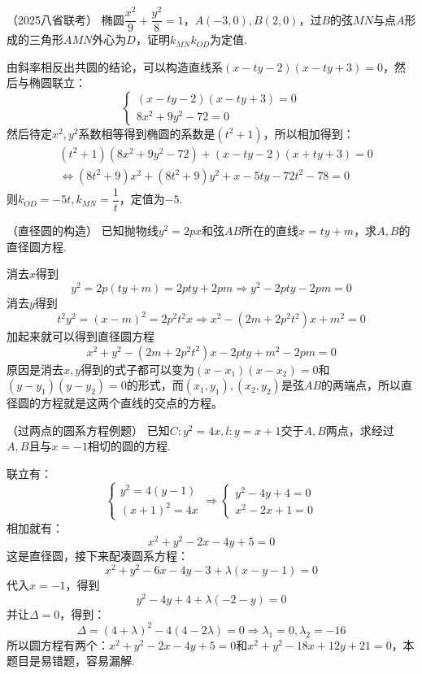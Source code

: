 \begin{example}{（2025八省联考）}{}
    椭圆$\dfrac{x^2}{9}+\dfrac{y^2}{8}=1$，$A(-3,0),B(2,0)$，过$B$的弦$MN$与点$A$形成的三角形$AMN$外心为$D$，证明$k_{MN}k_{OD}$为定值.
\end{example}
\begin{solution}
    由斜率相反出共圆的结论，可以构造直线系$(x-ty-2)(x-ty+3)=0$，然后与椭圆联立：
    \[\begin{cases}(x-ty-2)(x-ty+3)=0\\8x^2+9y^2-72=0\end{cases}\]
    然后待定$x^2,y^2$系数相等得到椭圆的系数是$(t^2+1)$，所以相加得到：
    \begin{align*}&(t^{2}+1)(8x^{2}+9y^{2}-72)+(x-ty-2)(x+ty+3)=0\\&\Leftrightarrow{}(8t^{2}+9)x^{2}+(8t^{2}+9)y^{2}+x-5ty-72t^{2}-78=0\end{align*}
    则$k_{OD}=-5t,k_{MN}=\dfrac1{t}$，定值为$-5$.
\end{solution}
\begin{example}{（直径圆的构造）}{}
    已知抛物线$y^2=2px$和弦$AB$所在的直线$x=ty+m$，求$A,B$的直径圆方程.
\end{example}
\begin{solution}
    消去$x$得到\[y^2=2p(ty+m)=2pty+2pm\Rightarrow y^2-2pty-2pm=0\]
    消去$y$得到\[t^2y^2=(x-m)^2=2p^2t^2x\Rightarrow x^2-(2m+2p^2t^2)x+m^2=0\]
    加起来就可以得到直径圆方程\[x^2+y^2-(2m+2p^2t^2)x-2pty+m^2-2pm=0\]
    原因是消去$x,y$得到的式子都可以变为$(x-x_1)(x-x_2)=0$和$(y-y_1)(y-y_2)=0$的形式，而$(x_1,y_1),(x_2,y_2)$是弦$AB$的两端点，所以直径圆的方程就是这两个直线的交点的方程。
\end{solution}
\begin{example}{（过两点的圆系方程例题）}{}
    已知$C:y^2=4x,l:y=x+1$交于$A,B$两点，求经过$A,B$且与$x=-1$相切的圆的方程.
\end{example}
\begin{solution}
    联立有：\[\begin{cases}y^2=4(y-1)\\(x+1)^2=4x\end{cases}\Rightarrow 
    \begin{cases}y^2-4y+4=0\\x^2-2x+1=0\end{cases}\]
    相加就有：\[x^2+y^2-2x-4y+5=0\]这是直径圆，接下来配凑圆系方程：
    \[x^{2}+y^{2}-6x-4y-3+\lambda(x-y-1)=0\]
    代入$x=-1$，得到\[y^{2}-4y+4+\lambda(-2-y)=0\]
    并让$\Delta=0$，得到：\[\Delta=(4+\lambda)^{2}-4(4-2\lambda)=0\Rightarrow 
    \lambda_1=0,\lambda_2=-16\]
    所以圆方程有两个：$x^2+y^2-2x-4y+5=0$和$x^2+y^2-18x+12y+21=0$，本题目是易错题，容易漏解.
\end{solution}
